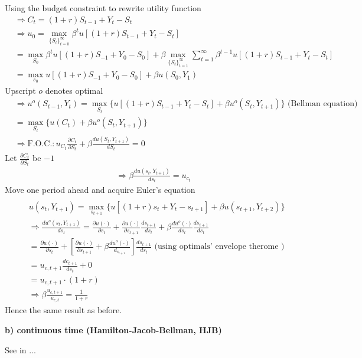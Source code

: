 \documentclass{article}
\begin{document}
Using the budget constraint to rewrite utility function
\begin{align}
& \Rightarrow C_{t}=(1+r)S_{t-1}+Y_{t}-S_{t}
\\& \Rightarrow u_{0}=\max_{\{S_{t}\}_{t=0}^{\infty}} \beta^{t}u[(1+r)S_{t-1}+Y_{t}-S_{t}]
\\&= \max_{S_{0}} \beta^{t}u[(1+r)S_{-1}+Y_{0}-S_{0}]+\beta \max_{\{S_{t}\}_{t=1}^{\infty}}\sum\limits_{t=1}^{\infty}\beta^{t-1}u[(1+r)S_{t-1}+Y_{t}-S_{t}]
\\&=\max_{s_{0}}u[(1+r)S_{-1}+Y_{0}-S_{0}]+\beta u (S_{0},Y_{1})
\end{align}
Upscript $o$ denotes optimal
\begin{align}
&\Rightarrow u^{o}(S_{t-1},Y_{t})=\max_{S_{t}}\{u[(1+r)S_{t-1}+Y_{t}-S_{t}]+\beta u^{o}(S_{t},Y_{t+1})\} \text{ (Bellman equation)}
\\&=\max_{S_{t}} \{u(C_{t})+\beta u^{o}(S_{t},Y_{t+1})\}
\\&\Rightarrow \text{F.O.C.}: u_{C_{t}} \frac{\partial  C_{t}}{\partial  S_{t}}+\beta \frac{du(S_{t},Y_{t+1})}{dS_{t}}=0
\end{align}
Let $\frac{\partial  C_{t}}{\partial  S_{t}}$ be $-1$
\begin{align}
\Rightarrow \beta \frac{du(s_{t},Y_{t+1})}{ds_{t}}=u_{c_{t}} 
\end{align}
Move one period ahead and acquire Euler's equation
\begin{align}
\\& u(s_{t},Y_{t+1})=\max_{s_{t+1}}\{u[(1+r)s_{t}+Y_{t}-s_{t+1}]+\beta u(s_{t+1},Y_{t+2})\}
\\&\Rightarrow \frac{du^{o} (s_{t},Y_{t+1})}{ds_{t}}=\frac{\partial u(\cdot)}{\partial s_{t}}+\frac{\partial u(\cdot)}{\partial s_{t+1}}\frac{ds_{t+1}}{ds_{t}}+\beta \frac{d u^{o}(\cdot)}{ds_{t}}\frac{ds_{t+1}}{ds_{t}}
\\&=\frac{\partial u(\cdot)}{\partial s_{t}}+[\frac{\partial u(\cdot)}{\partial  s_{t+1}}+\beta \frac{du^{o}(\cdot)}{d_{s_{t+1}}}]\frac{ds_{t+1}}{ds_{t}} \text{ (using optimals' envelope therome )}
\\&=u_{c,t+1}\frac{dc_{t+1}}{ds_{t}}+0
\\&=u_{c,t+1} \cdot (1+r)
\\&\Rightarrow \beta \frac{u_{c,t+1}}{u_{c,t}}=\frac{1}{1+r}
\end{align}
Hence the same result as before.

\textbf{b) continuous time (Hamilton-Jacob-Bellman, HJB)}

See in ...
\end{document}
